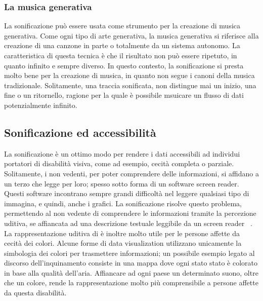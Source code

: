 \subsubsection{La musica generativa}
La sonificazione può essere usata come strumento per la creazione di musica generativa.
Come ogni tipo di arte generativa, la musica generativa si riferisce alla creazione di una canzone in parte o totalmente da un sistema autonomo.
La caratteristica di questa tecnica è che il risultato non può essere ripetuto, in quanto infinito e sempre diverso.
In questo contesto, la sonificazione si presta molto bene per la creazione di musica, in quanto non segue i canoni della musica tradizionale.
Solitamente, una traccia sonificata, non distingue mai un inizio, una fine o un ritornello, ragione per la quale è possibile msuicare un flusso di dati potenzialmente infinito.

\subsection{Sonificazione ed accessibilità}
La sonificazione è un ottimo modo per rendere i dati accessibili ad individui portatori di disabilità visiva, come ad esempio, cecità completa o parziale.
Solitamente, i non vedenti, per poter comprendere delle informazioni, si affidano a un terzo che legge per loro; spesso sotto forma di un software screen reader.
Questi software incontrano sempre grandi difficoltà nel leggere qualsiasi tipo di immagina, e quindi, anche i grafici.
La sonificazione risolve questo problema, permettendo al non vedente di comprendere le informazioni tramite la percezione uditiva, se affiancata ad una descrizione testuale leggibile da un screen reader ~\cite{accessibility}.
\\
La rappresentazione uditiva di è inoltre molto utile per le persone affette da cecità dei colori.
Alcune forme di data visualization utilizzano unicamente la simbologia dei colori per trasmettere informazioni; un possibile esempio legato al discorso dell'inquinamento consiste in una mappa dove ogni stato stato è colorato in base alla qualità dell'aria.
Affiancare ad ogni paese un determinato suono, oltre che un colore, rende la rappresentazione molto più comprensibile a persone affette da questa disabilità.

